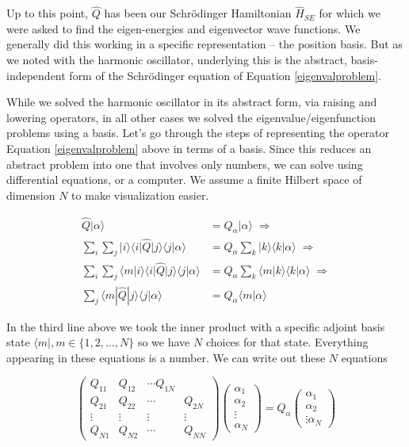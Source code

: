 Up to this point, $\hat{Q}$ has been our Schr\"odinger Hamiltonian
$\hat{H}_{SE}$ for which we were asked to find the eigen-energies and
eigenvector wave functions. We generally did this working in a specific
representation -- the position basis. But as we noted with the harmonic
oscillator, underlying this is the abstract, basis-independent form of the
Schr\"odinger equation of Equation \ref{eigenvalproblem}. 

While we solved the harmonic oscillator in its abstract form, via raising and
lowering operators, in all other cases we solved the eigenvalue/eigenfunction
problems using a basis. Let's go through the steps of representing the operator
Equation \ref{eigenvalproblem} above in terms of a basis. Since this reduces an
abstract problem into one that involves only numbers, we can solve using
differential equations, or a computer. We assume a finite Hilbert space of
dimension $N$ to make visualization easier. 

\begin{align} \label{}
  \hat{Q}|\alpha \rangle &= Q_\alpha |\alpha \rangle \; \Rightarrow \\ 
  \sum_{i}^{}  \sum_{j}^{} |i\rangle \langle i | \hat{Q} | j \rangle \langle
  j | \alpha \rangle &= Q_\alpha \sum_{k}^{} |k\rangle \langle k | \alpha
  \rangle \; \Rightarrow \\ 
  \sum_{i}^{} \sum_{j}^{} \langle m | i \rangle \langle i | \hat{Q} | j \rangle
  \langle j | \alpha \rangle &= Q_\alpha \sum_{k}^{} \langle m | k \rangle
  \langle k | \alpha \rangle \; \Rightarrow \\ 
  \sum_{j}^{} \langle m | \hat{Q} | j \rangle \langle j | \alpha \rangle &=
  Q_\alpha \langle m | \alpha \rangle \label{operatorbasis}
\end{align}\vspace{3px}

In the third line above we took the inner product with a specific adjoint basis
state $\langle m |, m \in \{1, 2, \hdots, N\}$ so we have  $N$ choices for that
state. Everything appearing in these equations is a number. We can write out
these $N$ equations

\[
\begin{pmatrix}
  Q_{11} & Q_{12} & \cdots Q_{1N} \\
  Q_{21} & Q_{22} & \cdots & Q_{2N} \\ 
  \vdots & \vdots & \vdots & \vdots \\ 
  Q_{N1} & Q_{N2} & \cdots & Q_{NN}  
\end{pmatrix} \begin{pmatrix}
  \alpha_1 \\ \alpha_2 \\ \vdots \\ \alpha_N 
\end{pmatrix} = Q_\alpha \begin{pmatrix}
  \alpha_1 \\ \alpha_2 \\ \vdots \alpha_N
\end{pmatrix} 
\] \vspace{3px}

